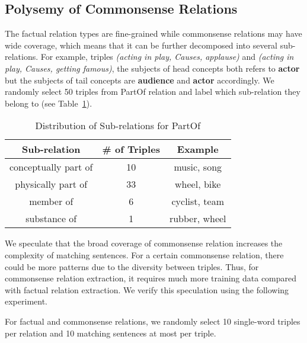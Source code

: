 \documentclass[11pt,a4paper]{article}
\newcommand{\KZ}[1]{\textcolor{blue}{Kenny: #1}}
\begin{document}



\subsection{Polysemy of Commonsense Relations}
The factual relation types are fine-grained while commonsense relations may 
have wide coverage, which means that it can be further decomposed into 
several sub-relations. For example, triples \textit{(acting in play, Causes, 
applause)} and \textit{(acting in play, Causes, getting famous)}, the subjects of head concepts both refers to \textbf{actor} but the subjects of tail concepts are \textbf{audience} and \textbf{actor} accordingly. We randomly select 50 triples from PartOf relation and label which sub-relation they belong to (see Table~\ref{table:sub-rel}).

\begin{table}[th]
	\small
	\begin{tabular}{|c|c|c|}
		\hline
		\textbf{Sub-relation} & \textbf{\# of Triples} & \textbf{Example}       \\ \hline
		conceptually part of & 10                & music, song   \\ \hline
		physically part of   & 33                & wheel, bike   \\ \hline
		member of            & 6                 & cyclist, team \\ \hline
		substance of         & 1                 & rubber, wheel \\ \hline
	\end{tabular}
	\caption{Distribution of Sub-relations for PartOf}
	\label{table:sub-rel}
\end{table}

We speculate that the broad coverage of commonsense relation 
increases the complexity of matching sentences. For a certain commonsense relation, there could be more patterns due to the diversity between triples. Thus, for commonsense relation extraction, it requires much more training data compared with factual relation extraction. We verify this speculation using
the following experiment.

	
For factual and commonsense relations, we randomly select 10 
single-word triples per relation and 10 matching sentences at most per triple. 
\end{document}
